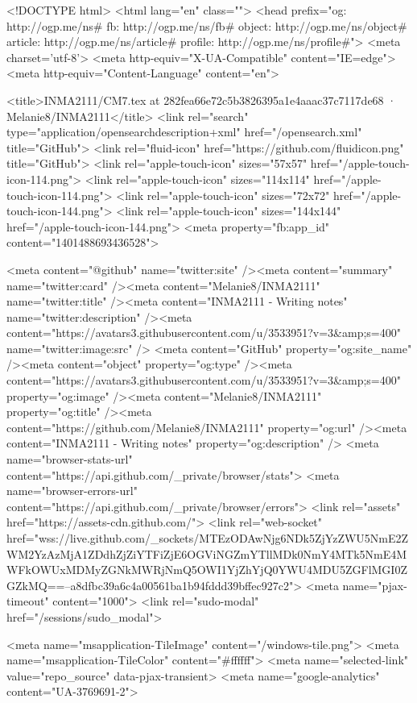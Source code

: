 


<!DOCTYPE html>
<html lang="en" class="">
  <head prefix="og: http://ogp.me/ns# fb: http://ogp.me/ns/fb# object: http://ogp.me/ns/object# article: http://ogp.me/ns/article# profile: http://ogp.me/ns/profile#">
    <meta charset='utf-8'>
    <meta http-equiv="X-UA-Compatible" content="IE=edge">
    <meta http-equiv="Content-Language" content="en">
    
    
    <title>INMA2111/CM7.tex at 282fea66e72c5b3826395a1e4aaac37c7117de68 · Melanie8/INMA2111</title>
    <link rel="search" type="application/opensearchdescription+xml" href="/opensearch.xml" title="GitHub">
    <link rel="fluid-icon" href="https://github.com/fluidicon.png" title="GitHub">
    <link rel="apple-touch-icon" sizes="57x57" href="/apple-touch-icon-114.png">
    <link rel="apple-touch-icon" sizes="114x114" href="/apple-touch-icon-114.png">
    <link rel="apple-touch-icon" sizes="72x72" href="/apple-touch-icon-144.png">
    <link rel="apple-touch-icon" sizes="144x144" href="/apple-touch-icon-144.png">
    <meta property="fb:app_id" content="1401488693436528">

      <meta content="@github" name="twitter:site" /><meta content="summary" name="twitter:card" /><meta content="Melanie8/INMA2111" name="twitter:title" /><meta content="INMA2111 - Writing notes" name="twitter:description" /><meta content="https://avatars3.githubusercontent.com/u/3533951?v=3&amp;s=400" name="twitter:image:src" />
      <meta content="GitHub" property="og:site_name" /><meta content="object" property="og:type" /><meta content="https://avatars3.githubusercontent.com/u/3533951?v=3&amp;s=400" property="og:image" /><meta content="Melanie8/INMA2111" property="og:title" /><meta content="https://github.com/Melanie8/INMA2111" property="og:url" /><meta content="INMA2111 - Writing notes" property="og:description" />
      <meta name="browser-stats-url" content="https://api.github.com/_private/browser/stats">
    <meta name="browser-errors-url" content="https://api.github.com/_private/browser/errors">
    <link rel="assets" href="https://assets-cdn.github.com/">
    <link rel="web-socket" href="wss://live.github.com/_sockets/MTEzODAwNjg6NDk5ZjYzZWU5NmE2ZWM2YzAzMjA1ZDdhZjZiYTFiZjE6OGViNGZmYTllMDk0NmY4MTk5NmE4MWFkOWUxMDMyZGNkMWRjNmQ5OWI1YjZhYjQ0YWU4MDU5ZGFlMGI0ZGZkMQ==--a8dfbc39a6c4a00561ba1b94fddd39bffec927c2">
    <meta name="pjax-timeout" content="1000">
    <link rel="sudo-modal" href="/sessions/sudo_modal">

    <meta name="msapplication-TileImage" content="/windows-tile.png">
    <meta name="msapplication-TileColor" content="#ffffff">
    <meta name="selected-link" value="repo_source" data-pjax-transient>
      <meta name="google-analytics" content="UA-3769691-2">

